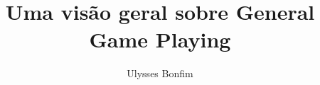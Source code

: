 \documentclass[a4paper]{sbgames}               %
\title{Uma visão geral sobre General Game Playing}
\author{Ulysses Bonfim}
\affiliation{Universidade Federal do Paraná}
\begin{document}


\maketitle



\keywordlist
\contactlist










\end{document}
